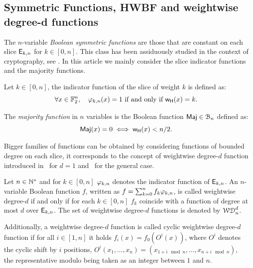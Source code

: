 \documentclass[11pt]{llncs}
\begin{document}
\subsection{Symmetric Functions, HWBF and weightwise degree-d functions}




The $n$-variable \emph{Boolean symmetric functions} are those that are constant on each slice $\mathsf{E}_{k,n}$ for $k\in [0,n]$. 
This class has been assiduously studied in the context of cryptography, see \eg \cite{IEEE:Carlet04,IEEE:CanVid05,INDO:BraPre05,DM:SarMai07,IEEE:QFLW09,IEEE:CheLu11,Latin:Meaux19,CCDS:Meaux21,IEEE:CarMea21}.
In this article we mainly consider the slice indicator functions and the majority functions.
\begin{definition}\label{def:slice}
 Let $k\in [0,n]$, the indicator function of the slice of weight $k$ is defined as:
 \[\forall  x\in \mathbb{F}_2^{n}, \quad \varphi_{k,n}(x) = 1 \text{ if and only if } \mathsf{w_H}(x) = k.\]
\end{definition}


\begin{definition}\label{def:maj}
    The \emph{majority function} in $n$ variables is the Boolean function $\textsf{Maj}\in\mathcal{B}_n$ defined as:
    \[
        \textsf{Maj}(x)=0\iff\mathsf{w_H}(x)<n/2.
    \]
\end{definition}

Bigger families of functions can be obtained by considering functions of bounded degree on each slice, it corresponds to the concept of weightwise degree-$d$ function introduced in~\cite{DAM:GinMea22} for $d=1$ and~\cite{DAM:MeaOza24} for the general case. 

\begin{definition}\label{def:wwdegd}
	Let $n\in \mathbb{N}^*$ and for $k\in[0,n]$ $\varphi_{k,n}$ denotes the indicator function of $\mathsf{E}_{k,n}$. 
	An $n$-variable Boolean function $f$, written as $f=\sum_{k=0}^n f_k \varphi_{k,n}$, is called weightwise degree-$d$ if and only if for each $k\in [0,n]$ $f_k$ coincide with a function of degree at most $d$ over $\mathsf{E}_{k,n}$. 
		The set of weightwise degree-$d$ functions is denoted by $\mathcal{WD}^{d}_{n}$.
		
Additionally, a weightwise degree-$d$ function is called cyclic weightwise degree-$d$ function if for all $i\in [1,n]$ it holds $f_i(x)=f_0(O^i(x))$, where $O^i$ denotes the cyclic shift by $i$ positions, $O^i(x_1,\dots,x_n)=(x_{1+i \mod n},\dots,x_{n+i \mod n})$, the representative modulo being taken as an integer between $1$ and $n$.
\end{definition}
\end{document}
